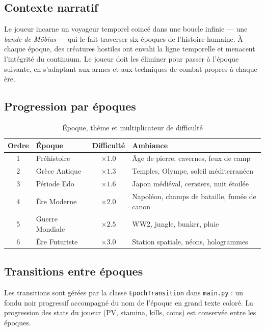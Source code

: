 \documentclass[12pt, a4paper]{report}
\begin{document}
\subsection{Contexte narratif}

Le joueur incarne un voyageur temporel coinc\'{e} dans une boucle infinie --- une \textit{bande de M\"{o}bius} --- qui le fait traverser six \'{e}poques de l'histoire humaine. \`{A} chaque \'{e}poque, des cr\'{e}atures hostiles ont envahi la ligne temporelle et menacent l'int\'{e}grit\'{e} du continuum. Le joueur doit les \'{e}liminer pour passer \`{a} l'\'{e}poque suivante, en s'adaptant aux armes et aux techniques de combat propres \`{a} chaque \`{e}re.

\subsection{Progression par \'{e}poques}

\begin{table}[H]
\centering
\caption{\'{E}poque, th\`{e}me et multiplicateur de difficult\'{e}}
\begin{tabular}{clcl}
\toprule
\textbf{Ordre} & \textbf{\'{E}poque} & \textbf{Difficult\'{e}} & \textbf{Ambiance} \\
\midrule
1 & Pr\'{e}histoire       & $\times 1.0$ & \^{A}ge de pierre, cavernes, feux de camp \\
2 & Gr\`{e}ce Antique    & $\times 1.3$ & Temples, Olympe, soleil m\'{e}diterran\'{e}en \\
3 & P\'{e}riode Edo      & $\times 1.6$ & Japon m\'{e}di\'{e}val, cerisiers, nuit \'{e}toil\'{e}e \\
4 & \`{E}re Moderne      & $\times 2.0$ & Napol\'{e}on, champs de bataille, fum\'{e}e de canon \\
5 & Guerre Mondiale  & $\times 2.5$ & WW2, jungle, bunker, pluie \\
6 & \`{E}re Futuriste    & $\times 3.0$ & Station spatiale, n\'{e}ons, hologrammes \\
\bottomrule
\end{tabular}
\end{table}

\subsection{Transitions entre \'{e}poques}

Les transitions sont g\'{e}r\'{e}es par la classe \texttt{EpochTransition} dans \texttt{main.py} : un fondu noir progressif accompagn\'{e} du nom de l'\'{e}poque en grand texte color\'{e}. La progression des stats du joueur (PV, stamina, kills, coins) est conserv\'{e}e entre les \'{e}poques.
\end{document}
